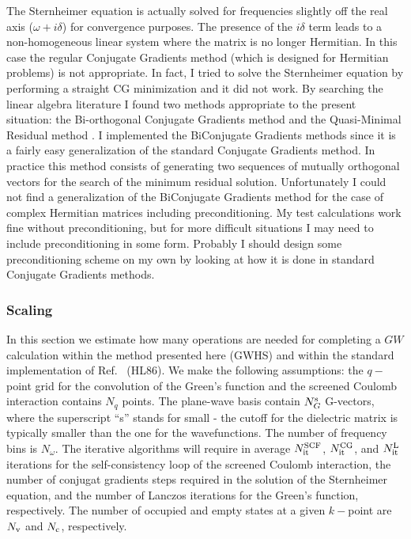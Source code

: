 \documentclass[12pt]{article}
\def\w{\omega}
\begin{document}
The Sternheimer equation is actually solved for frequencies slightly off the
real axis ($\w+i\delta$) for convergence purposes.
The presence of the $i\delta$ term leads to a 
non-homogeneous linear system where the matrix is no longer Hermitian.
In this case the regular Conjugate Gradients method 
(which is designed for Hermitian problems) is not appropriate. In fact,
I tried to solve the Sternheimer equation by performing a straight CG minimization
and it did not work.
By searching the linear algebra literature I found two methods appropriate 
to the present situation: the Bi-orthogonal Conjugate Gradients method 
and the Quasi-Minimal Residual method \cite{linsys}. 
I implemented the BiConjugate Gradients methods \cite{BCG} since it is a fairly
easy generalization of the standard Conjugate Gradients method.
In practice this method consists of generating two sequences of mutually
orthogonal vectors for the search of the minimum residual solution.
Unfortunately I could not find a generalization of the BiConjugate
Gradients method for the case of complex Hermitian matrices including preconditioning.
My test calculations work fine without preconditioning, but for more
difficult situations I may need to include preconditioning in some form.
Probably I should design some preconditioning scheme on my own by looking
at how it is done in standard Conjugate Gradients methods.

\subsubsection*{Scaling}

In this section we estimate how many operations are needed for completing a $GW$ calculation
within the method presented here (GWHS) and within the standard implementation of Ref.\ \cite{hl86} (HL86).
We make the following assumptions: the $q-$point grid for the convolution of the Green's function and the screened
Coulomb interaction contains $N_q$ points. The plane-wave basis 
contain $N_G^{\rm s}$ G-vectors, where the superscript ``s'' stands for small - the cutoff for
the dielectric matrix is typically smaller than the one for the wavefunctions.
The number of frequency bins is $N_\omega$. The iterative
algorithms will require in average $N_{\rm it}^{\rm SCF}$, $N_{\rm it}^{\rm CG}$,
and $N_{\rm it}^{\rm L}$ iterations for the self-consistency loop of the screened
Coulomb interaction, the number of conjugat gradients steps required in the
solution of the Sternheimer equation, and the number of Lanczos iterations
for the Green's function, respectively. The number of occupied and empty states at a given
$k-$point are $N_{\rm v}$ and $N_{\rm c}$, respectively.
\end{document}
